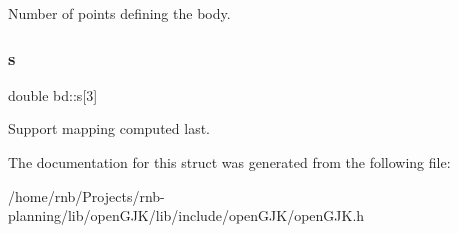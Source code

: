 Number of points defining the body. \mbox{\label{structbd_a68a6f689c5ced6af14d1c1dff58fa559}} 
\subsubsection{\texorpdfstring{s}{s}}
{\footnotesize\ttfamily double bd\+::s\mbox{[}3\mbox{]}}

Support mapping computed last. 

The documentation for this struct was generated from the following file\+:\begin{DoxyCompactItemize}
\item 
/home/rnb/\+Projects/rnb-\/planning/lib/open\+G\+J\+K/lib/include/open\+G\+J\+K/open\+G\+J\+K.\+h\end{DoxyCompactItemize}
